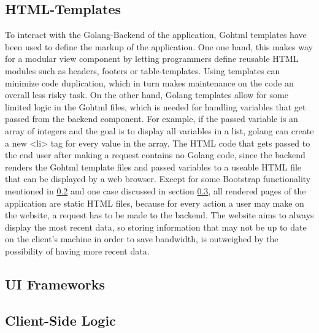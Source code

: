 \subsection{HTML-Templates}
To interact with the Golang-Backend of the application, Gohtml templates have been used to define the markup of the application. One one hand, this makes way for a modular view component by letting programmers define reusable HTML modules such as headers, footers or table-templates. Using templates can minimize code duplication, which in turn makes maintenance on the code an overall less risky task. On the other hand, Golang templates allow for some limited logic in the Gohtml files, which is needed for handling variables that get passed from the backend component. For example, if the passed variable is an array of integers and the goal is to display all variables in a list, golang can create a new <li> tag for every value in the array. The HTML code that gets passed to the end user after making a request contains no Golang code, since the backend renders the Gohtml template files and passed variables to a useable HTML file that can be displayed by a web browser. Except for some Bootstrap functionality mentioned in \ref{sec:uiframeworks} and one case discussed in section \ref{sec:clientside}, all rendered pages of the application are static HTML files, because for every action a user may make on the website, a request has to be made to the backend. The website aims to always display the most recent data, so storing information that may not be up to date on the client's machine in order to save bandwidth, is outweighed by the possibility of having more recent data. 

\subsection{UI Frameworks} \label{sec:uiframeworks}
\subsection{Client-Side Logic} \label{sec:clientside}